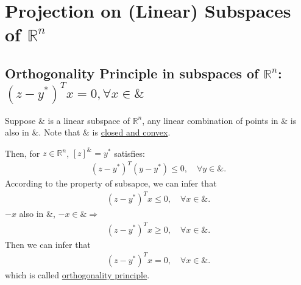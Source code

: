 \documentclass[11pt]{elegantbook}
\begin{document}
\section{Projection on (Linear) Subspaces of $\mathbb{R}^n$}
\subsection{Orthogonality Principle in subspaces of $\mathbb{R}^n$: $(z-y^*)^Tx= 0,\forall x\in\&$}
Suppose $\&$ is a linear subspace of $\mathbb{R}^n$, any linear combination of points in $\&$ is also in $\&$. Note that $\&$ is \underline{closed and convex}.

Then, for $z\in \mathbb{R}^n$, $[z]^\&=y^*$ satisfies:
\begin{equation}
    \begin{aligned}
        (z-y^*)^T(y-y^*)\leq 0,\quad \forall y\in\&.
    \end{aligned}
    \nonumber
\end{equation}
According to the property of subsapce, we can infer that
\begin{equation}
    \begin{aligned}
        (z-y^*)^Tx\leq 0,\quad \forall x\in\&.
    \end{aligned}
    \nonumber
\end{equation}
$-x$ also in $\&$, $-x\in\& \Rightarrow$
\begin{equation}
    \begin{aligned}
        (z-y^*)^Tx\geq 0,\quad \forall x\in\&.
    \end{aligned}
    \nonumber
\end{equation}
Then we can infer that
\begin{equation}
    \begin{aligned}
        (z-y^*)^Tx= 0,\quad \forall x\in\&.
    \end{aligned}
    \nonumber
\end{equation}
which is called \underline{orthogonality principle}.
\end{document}

